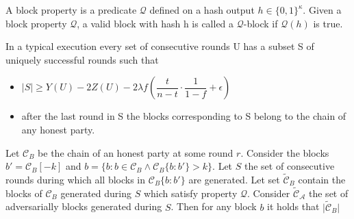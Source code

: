 \begin{definition}
    \cite{dionyziz}
    A block property is a predicate $\mathcal{Q}$ defined on a hash output $h \in \{ 0, 1 \}^\kappa$. Given  a block property $\mathcal{Q}$, a valid block with hash h is called a $\mathcal{Q}$-block if $\mathcal{Q}(h)$ is true.
\end{definition}

\begin{lemma}[Unsuppressibility]\cite{dionyziz}
    In a typical execution every set of consecutive rounds U has a subset S of uniquely successful rounds such that
    \begin{itemize}
        \item $\vert S \vert \geq Y(U) - 2Z(U) - 2 \lambda f (\dfrac{t}{n-t} \cdot \dfrac{1}{1-f} + \epsilon)$
        \item after the last round in S the blocks corresponding to S belong to the chain of any honest party.
    \end{itemize}
\end{lemma}

\begin{lemma}
    Let $\mathcal{C}_B$ be the chain of an honest party at some round $r$. Consider the blocks $b' = \mathcal{C}_B[-k]$ and $b = \{b: b \in \mathcal{C}_B \wedge \mathcal{C}_B\{b:b'\} > k\}$. Let $S$ the set of consecutive rounds during which all blocks in $\mathcal{C}_B\{b:b'\}$ are generated. Let set $\widetilde{\mathcal{C}}_B$ contain the blocks of $\mathcal{C}_B$ generated during $S$ which satisfy property $\mathcal{Q}$.  Consider $\widetilde{\mathcal{C}}_\mathcal{A}$ the set of adversarially blocks generated during $S$. Then for any block $b$ it holds that $ \vert \widetilde{\mathcal{C}}_B \vert $
\end{lemma} 